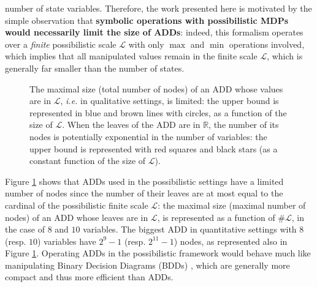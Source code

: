 number of state variables.
Therefore, the work presented here is motivated by the simple observation that
\textbf{symbolic operations with possibilistic MDPs would necessarily
limit the size of ADDs}: indeed, this formalism operates over a \emph{finite}
possibilistic scale $\mathcal{L}$ with only $\max$ and $\min$ operations involved,
which implies that all manipulated values remain in the %
finite scale $\mathcal{L}$, which is generally far smaller than the number of states.
\begin{figure} \centering
{}
\caption[Limitations of the maximal size of an ADD in the possibilistic settings]{
The maximal size (total number of nodes) 
of an ADD whose values are in $\mathcal{L}$,
\textit{i.e.} in qualitative settings, is limited:
the upper bound is represented in blue and brown lines with circles,
as a function of the size of $\mathcal{L}$.
When the leaves of the ADD are in $\mathbb{R}$,
the number of its nodes is potentially exponential in the number of variables:
the upper bound is represented with red squares and black stars
(as a constant function of the size of $\mathcal{L}$).}
\label{ADDsize}
\end{figure}

Figure \ref{ADDsize} shows that 
ADDs used in the possibilistic settings 
have a limited number of nodes
since the number of their leaves 
are at most equal 
to the cardinal of the possibilistic
finite scale $\mathcal{L}$:
the maximal size (maximal number of nodes) of an ADD
whose leaves are in $\mathcal{L}$, is represented
as a function of $\# \mathcal{L}$,
in the case of $8$ and $10$ variables. 
The biggest ADD in quantitative settings
with $8$ (resp. $10$) variables 
have $2^9-1$ (resp. $2^{11}-1$) nodes,
as represented also in Figure \ref{ADDsize}.
Operating ADDs in the possibilistic framework would behave much
like manipulating Binary Decision Diagrams (BDDs)
\cite{Bryant92symbolicboolean}, which are generally more compact and thus more
efficient than ADDs. 

